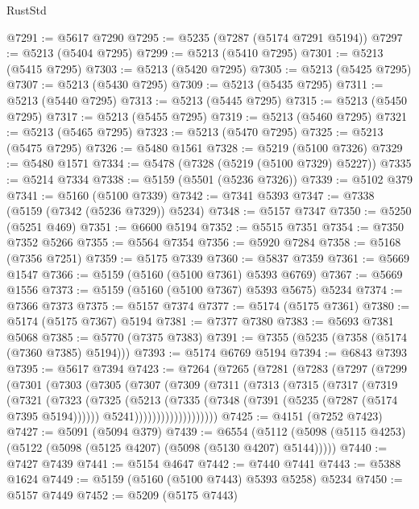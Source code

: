\begin{lexlean}{RustStd}
\begin{coremodule}
@7291 := @5617 @7290
@7295 := @5235 (@7287 (@5174 @7291 @5194))
@7297 := @5213 (@5404 @7295)
@7299 := @5213 (@5410 @7295)
@7301 := @5213 (@5415 @7295)
@7303 := @5213 (@5420 @7295)
@7305 := @5213 (@5425 @7295)
@7307 := @5213 (@5430 @7295)
@7309 := @5213 (@5435 @7295)
@7311 := @5213 (@5440 @7295)
@7313 := @5213 (@5445 @7295)
@7315 := @5213 (@5450 @7295)
@7317 := @5213 (@5455 @7295)
@7319 := @5213 (@5460 @7295)
@7321 := @5213 (@5465 @7295)
@7323 := @5213 (@5470 @7295)
@7325 := @5213 (@5475 @7295)
@7326 := @5480 @1561
@7328 := @5219 (@5100 @7326)
@7329 := @5480 @1571
@7334 := @5478 (@7328 (@5219 (@5100 @7329) @5227))
@7335 := @5214 @7334
@7338 := @5159 (@5501 (@5236 @7326))
@7339 := @5102 @379
@7341 := @5160 (@5100 @7339)
@7342 := @7341 @5393
@7347 := @7338 (@5159 (@7342 (@5236 @7329)) @5234)
@7348 := @5157 @7347
@7350 := @5250 (@5251 @469)
@7351 := @6600 @5194
@7352 := @5515 @7351
@7354 := @7350 @7352 @5266
@7355 := @5564 @7354
@7356 := @5920 @7284
@7358 := @5168 (@7356 @7251)
@7359 := @5175 @7339
@7360 := @5837 @7359
@7361 := @5669 @1547
@7366 := @5159 (@5160 (@5100 @7361) @5393 @6769)
@7367 := @5669 @1556
@7373 := @5159 (@5160 (@5100 @7367) @5393 @5675) @5234
@7374 := @7366 @7373
@7375 := @5157 @7374
@7377 := @5174 (@5175 @7361)
@7380 := @5174 (@5175 @7367) @5194
@7381 := @7377 @7380
@7383 := @5693 @7381 @5068
@7385 := @5770 (@7375 @7383)
@7391 := @7355 (@5235 (@7358 (@5174 (@7360 @7385) @5194)))
@7393 := @5174 @6769 @5194
@7394 := @6843 @7393
@7395 := @5617 @7394
@7423 := @7264
    (@7265
      (@7281
        (@7283
          (@7297
            (@7299
              (@7301
                (@7303
                  (@7305
                    (@7307
                      (@7309
                        (@7311
                          (@7313
                            (@7315
                              (@7317
                                (@7319
                                  (@7321
                                    (@7323
                                      (@7325
                                        (@5213
                                          (@7335
                                            (@7348 (@7391 (@5235 (@7287 (@5174 @7395 @5194))))))
                                          @5241)))))))))))))))))))
@7425 := @4151 (@7252 @7423)
@7427 := @5091 (@5094 @379)
@7439 := @6554
    (@5112 (@5098 (@5115 @4253) (@5122 (@5098 (@5125 @4207) (@5098 (@5130 @4207) @5144)))))
@7440 := @7427 @7439
@7441 := @5154 @4647
@7442 := @7440 @7441
@7443 := @5388 @1624
@7449 := @5159 (@5160 (@5100 @7443) @5393 @5258) @5234
@7450 := @5157 @7449
@7452 := @5209 (@5175 @7443)

\end{coremodule}
\end{lexlean}
